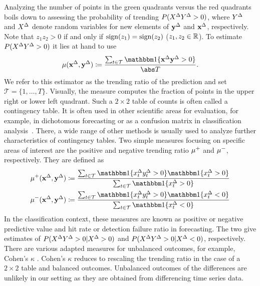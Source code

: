 Analyzing the number of points in the green quadrants versus the red quadrants boils down to assessing the probability of trending $P(X^{\Delta} Y^{\Delta} > 0)$, where $Y^{\Delta}$ and $X^{\Delta}$ denote random variables for new elements of $\mathbf{y}^{\Delta}$ and $\mathbf{x}^{\Delta}$, respectively. 
Note that $z_1 z_2 > 0$ if and only if $\operatorname{sign}(z_1) = \operatorname{sign}(z_2)$ ($z_1, z_2 \in \mathbb{R}$).
To estimate $P(X^{\Delta} Y^{\Delta} > 0)$ it lies at hand to use
\begin{equation}
    \acc (\diffx, \diffy) \coloneqq \frac{\sum_{t \in \mathcal{T}} \ind{\diffx \diffy > 0}}{\card{T}}.\label{eq:acc}
\end{equation}
We refer to this estimator as the trending ratio of the prediction and set $\mathcal{T} = \{1, \dots, T\}$.
Visually, the measure computes the fraction of points in the upper right or lower left quadrant.
Such a $2 \times 2$ table of counts is often called a contingency table. It is often used in other scientific areas for evaluation, for example, in dichotomous forecasting or as a confusion matrix in classification analysis~\parencites(see, e.g., the introductions in)()[Ch. 4]{James2021}[Ch. 3]{Jolliffe2012}.
There, a wide range of other methods is usually used to analyze further characteristics of contingency tables.
Two simple measures focusing on specific areas of interest are the positive and negative trending ratio $\mu^+$ and $\mu^-$, respectively.
They are defined as
\begin{align}
    \accp (\diffx, \diffy) &\coloneqq \frac{\sum_{t \in \mathcal{T}} \ind{\diffxt \diffyt > 0} \ind{\diffxt > 0}}{\sum_{t \in \mathcal{T}} \ind{\diffxt > 0}} \label{eq:accp}\\
    \accm (\diffx, \diffy) &\coloneqq \frac{\sum_{t \in \mathcal{T}} \ind{\diffxt \diffyt > 0} \ind{\diffxt < 0}}{\sum_{t \in \mathcal{T}} \ind{\diffxt < 0}}\label{eq:accm}
\end{align}
In the classification context, these measures are known as positive or negative predictive value and hit rate or detection failure ratio in forecasting.
The two give estimates of $P(X^{\Delta} Y^{\Delta} > 0 | X^{\Delta} > 0)$ and $P(X^{\Delta} Y^{\Delta} > 0 | X^{\Delta} < 0)$, respectively.
There are various adapted measures for unbalanced outcomes, for example, Cohen's $\kappa$ .
Cohen's $\kappa$ reduces to rescaling the trending ratio in the case of a $2\times2$ table and balanced outcomes.
Unbalanced outcomes of the differences are unlikely in our setting as they are obtained from differencing time series data.
